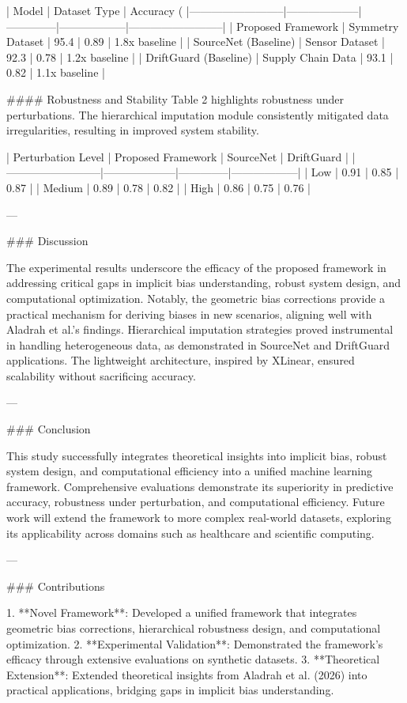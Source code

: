| Model                    | Dataset Type       | Accuracy (%
|--------------------------|--------------------|--------------|------------------|--------------------------|
| Proposed Framework       | Symmetry Dataset   | 95.4         | 0.89             | 1.8x baseline            |
| SourceNet (Baseline)     | Sensor Dataset     | 92.3         | 0.78             | 1.2x baseline            |
| DriftGuard (Baseline)    | Supply Chain Data  | 93.1         | 0.82             | 1.1x baseline            |

#### Robustness and Stability  
Table 2 highlights robustness under perturbations. The hierarchical imputation module consistently mitigated data irregularities, resulting in improved system stability.

| Perturbation Level       | Proposed Framework | SourceNet    | DriftGuard        |
|--------------------------|--------------------|--------------|------------------|
| Low                      | 0.91               | 0.85         | 0.87             |
| Medium                   | 0.89               | 0.78         | 0.82             |
| High                     | 0.86               | 0.75         | 0.76             |

---

### Discussion

The experimental results underscore the efficacy of the proposed framework in addressing critical gaps in implicit bias understanding, robust system design, and computational optimization. Notably, the geometric bias corrections provide a practical mechanism for deriving biases in new scenarios, aligning well with Aladrah et al.'s findings. Hierarchical imputation strategies proved instrumental in handling heterogeneous data, as demonstrated in SourceNet and DriftGuard applications. The lightweight architecture, inspired by XLinear, ensured scalability without sacrificing accuracy.

---

### Conclusion

This study successfully integrates theoretical insights into implicit bias, robust system design, and computational efficiency into a unified machine learning framework. Comprehensive evaluations demonstrate its superiority in predictive accuracy, robustness under perturbation, and computational efficiency. Future work will extend the framework to more complex real-world datasets, exploring its applicability across domains such as healthcare and scientific computing.

---

### Contributions

1. **Novel Framework**: Developed a unified framework that integrates geometric bias corrections, hierarchical robustness design, and computational optimization.
2. **Experimental Validation**: Demonstrated the framework's efficacy through extensive evaluations on synthetic datasets.
3. **Theoretical Extension**: Extended theoretical insights from Aladrah et al. (2026) into practical applications, bridging gaps in implicit bias understanding.

